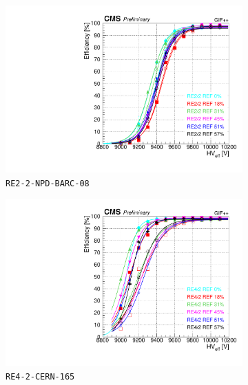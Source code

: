 \begin{figure}[H]
\begin{subfigure}{0.5\linewidth}
    		\includegraphics[width = \linewidth]{fig/chapt5/efficiency_vs_HVeff_RE2_2-REF.pdf}
        	\caption{\label{fig:GIFpp_eff_vs_HVeff:C} \texttt{RE2-2-NPD-BARC-08}}
    	\end{subfigure}
    	\begin{subfigure}{0.5\linewidth}
			\centering
    		\includegraphics[width = \linewidth]{fig/chapt5/efficiency_vs_HVeff_RE4_2-REF.pdf}
        	\caption{\label{fig:GIFpp_eff_vs_HVeff:D} \texttt{RE4-2-CERN-165}}
    	\end{subfigure}
		\caption{\label{fig:GIFpp_eff_vs_HVeff} }
	\end{figure}
	
